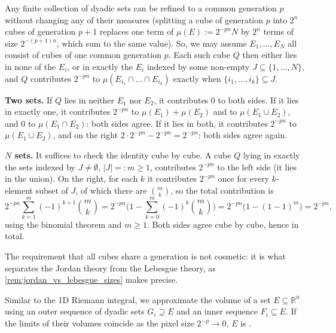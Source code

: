 \begin{exercisesolution}
Any finite collection of dyadic sets can be refined to a common generation $p$ without changing
any of their measures (splitting a cube of generation $p$ into $2^n$ cubes of generation $p+1$
replaces one term of $\mu(E) := 2^{-pn}N$ by $2^n$ terms of size $2^{-(p+1)n}$, which sum to the
same value). So, we may assume $E_1,\dots,E_N$ all consist of cubes of one common generation
$p$. Each such cube $Q$ then either lies in none of the $E_i$, or in exactly the $E_i$ indexed
by some non-empty $J \subseteq \{1,\dots,N\}$, and $Q$ contributes $2^{-pn}$ to
$\mu(E_{i_1}\cap\dots\cap E_{i_k})$ exactly when $\{i_1,\dots,i_k\}\subseteq J$.

\textbf{Two sets.} If $Q$ lies in neither $E_1$ nor $E_2$, it contributes $0$ to both sides. If
it lies in exactly one, it contributes $2^{-pn}$ to $\mu(E_1)+\mu(E_2)$ and to
$\mu(E_1\cup E_2)$, and $0$ to $\mu(E_1\cap E_2)$: both sides agree. If it lies in both, it
contributes $2^{-pn}$ to $\mu(E_1\cup E_2)$, and on the right
$2\cdot2^{-pn}-2^{-pn}=2^{-pn}$: both sides agree again.

\textbf{$N$ sets.} It suffices to check the identity cube by cube. A cube $Q$ lying in exactly
the sets indexed by $J\neq\emptyset$, $|J|=:m\geq1$, contributes $2^{-pn}$ to the left side (it
lies in the union). On the right, for each $k$ it contributes $2^{-pn}$ once for every
$k$-element subset of $J$, of which there are $\binom{m}{k}$, so the total contribution is
\[2^{-pn}\sum_{k=1}^m(-1)^{k+1}\binom{m}{k} = 2^{-pn}\Big(1-\sum_{k=0}^m(-1)^k\binom{m}{k}\Big)
  = 2^{-pn}\big(1-(1-1)^m\big) = 2^{-pn},\]
using the binomial theorem and $m\geq1$. Both sides agree cube by cube, hence in total.
\end{exercisesolution}

The requirement that all cubes share a generation is not cosmetic: it is what separates the
Jordan theory from the Lebesgue theory, as \cref{rem:jordan_vs_lebesgue_sizes} makes precise.

Similar to the 1D Riemann integral, we approximate the volume of a set $E \subseteq \mathbb{R}^n$ using an outer sequence of dyadic sets $G_i \supseteq E$ and an inner sequence $F_i \subseteq E$. If the limits of their volumes coincide as the pixel size $2^{-p} \to 0$, $E$ is .

